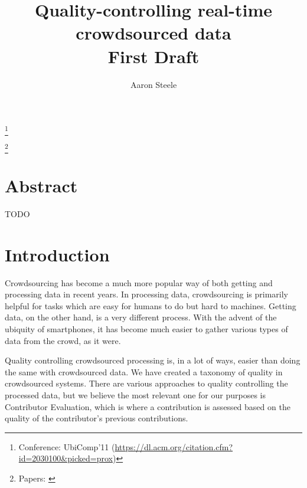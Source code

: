 \documentclass[12pt,twocolumn]{article}
\title{Quality-controlling real-time crowdsourced data \\ \large First Draft}
\author{Aaron Steele}
\date{}
\newcommand\blfootnote[1]{%
	\begingroup
	\renewcommand\thefootnote{}\footnote{#1}%
	\addtocounter{footnote}{-1}%
	\endgroup
}
\begin{document}
	\maketitle
	
	\blfootnote{Conference: UbiComp'11 (\url{https://dl.acm.org/citation.cfm?id=2030100&picked=prox}) }
	\blfootnote{Papers: \cite{UB-QC-CC}\cite{QC-CC}}
	
	
	\section*{Abstract}
	    TODO
	\section*{Introduction}
	    Crowdsourcing has become a much more popular way of both getting and processing data in recent years. In processing data, crowdsourcing is primarily helpful for tasks which are easy for humans to do but hard to machines. %
	    Getting data, on the other hand, is a very different process. With the advent of the ubiquity of smartphones, it has become much easier to gather various types of data from the crowd, as it were.
	    
	    Quality controlling crowdsourced processing is, in a lot of ways, easier than doing the same with crowdsourced data. We have created a taxonomy of quality in crowdsourced systems. There are various approaches to quality controlling the processed data, but we believe the most relevant one for our purposes is Contributor Evaluation, which is where a contribution is assessed based on the quality of the contributor's previous contributions. 
	    
\end{document}
